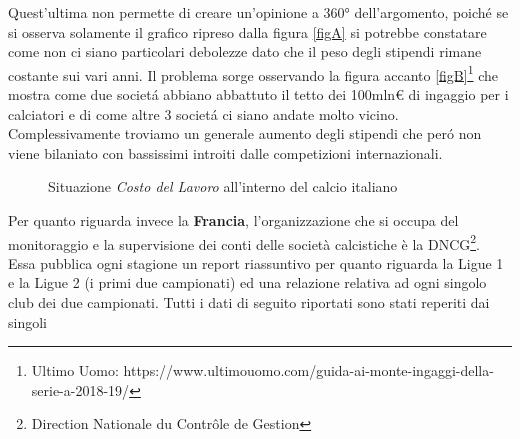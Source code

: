 \documentclass[
    corpo=12pt,
    oneside,
    evenboxes,
    tipotesi=triennale,
    stile=classica,
    oldstyle,
    autoretitolo,
    greek,
]{toptesi}
\begin{document}
\begin{interlinea}{1.5}
Quest'ultima non permette di creare un'opinione a 360° dell'argomento, poich\'e se si osserva solamente il grafico ripreso 
dalla figura \ref{figA} si potrebbe constatare come non ci siano particolari debolezze dato che il peso degli stipendi rimane costante sui vari anni. 
Il problema sorge osservando la figura accanto \ref{figB}\footnote{Ultimo Uomo: https://www.ultimouomo.com/guida-ai-monte-ingaggi-della-serie-a-2018-19/} 
che mostra come due societ\'a abbiano abbattuto il tetto dei 100mln€ di ingaggio per i calciatori e di come altre 3 societ\'a ci 
siano andate molto vicino. Complessivamente troviamo un generale aumento degli stipendi che per\'o non viene bilaniato con bassissimi introiti 
dalle competizioni internazionali.\newline
\begin{figure}
    \centering
     \quad
    \caption{Situazione \emph{Costo del Lavoro} all'interno del calcio italiano}
    \label{wage_serieA}  
\end{figure}\newline
Per quanto riguarda invece la \textbf{Francia}, l'organizzazione che si occupa del monitoraggio e la supervisione dei conti 
delle società calcistiche è la DNCG\footnote{Direction Nationale du Contrôle de Gestion}. Essa 
pubblica ogni stagione un report riassuntivo per quanto riguarda la Ligue 1 e la Ligue 2 (i primi due campionati) ed una
relazione relativa ad ogni singolo club dei due campionati. Tutti i dati di seguito riportati sono stati reperiti dai singoli

\end{interlinea}
\end{document}
